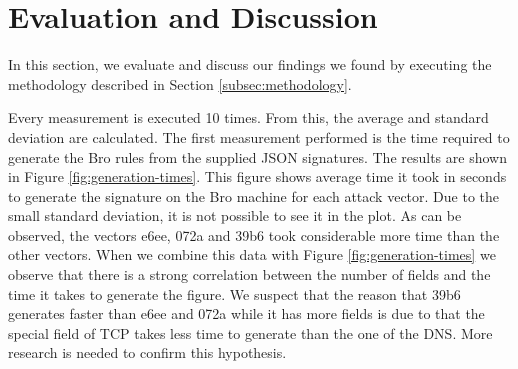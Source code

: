 \section{Evaluation and Discussion}\label{subsec:evaluation-discussion}
In this section, we evaluate and discuss our findings we found by executing the methodology described in Section \ref{subsec:methodology}.

Every measurement is executed 10 times. From this, the average and standard deviation are calculated. The first measurement performed is the time required to generate the Bro rules from the supplied JSON signatures. The results are shown in Figure \ref{fig:generation-times}. This figure shows average time it took in seconds to generate the signature on the Bro machine for each attack vector. Due to the small standard deviation, it is not possible to see it in the plot. As can be observed, the vectors e6ee, 072a and 39b6 took considerable more time than the other vectors. When we combine this data with Figure \ref{fig:generation-times} we observe that there is a strong correlation between the number of fields and the time it takes to generate the figure. We suspect that the reason that 39b6 generates faster than e6ee and 072a while it has more fields is due to that the special field of TCP takes less time to generate than the one of the DNS. More research is needed to confirm this hypothesis.  



